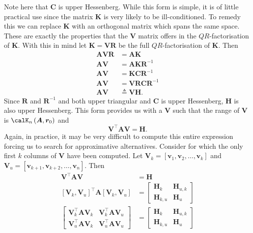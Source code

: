 Note here that $\bm{C}$ is upper Hessenberg. While this form is simple, it is of little practical use since the matrix $\bm{K}$ is very likely to be ill-conditioned. To remedy this we can replace $\bm{K}$ with an orthogonal matrix which spans the same space. These are exactly the properties that the $\bm{V}$ matrix offers in the $QR$-factorisation of $\bm{K}$. With this in mind let $\bm{K} = \bm{V} \bm{R}$ be the full $QR$-factorisation of $\bm{K}$. Then
\begin{align*}
    \bm{A} \bm{V} \bm{R} & = \bm{A} \bm{K}                    \\
    \bm{A} \bm{V}        & = \bm{A} \bm{K} \bm{R}^{-1}        \\
    \bm{A} \bm{V}        & = \bm{K} \bm{C} \bm{R}^{-1}        \\
    \bm{A} \bm{V}        & = \bm{V} \bm{R} \bm{C} \bm{R}^{-1} \\
    \bm{A} \bm{V}        & \triangleq \bm{V} \bm{H}.
\end{align*}
Since $\bm{R}$ and $\bm{R}^{-1}$ and both upper triangular and $\bm{C}$ is upper Hessenberg, $\bm{H}$ is also upper Hessenberg. This form provides us with a $\bm{V}$ such that the range of $\bm{V}$ is $\calK_{n} \left( \bm{A}, \bm{r}_0 \right)$ and
\begin{equation}\label{eq: QTAQ_eq_H}
    \bm{V}^{\intercal} \bm{A} \bm{V} = \bm{H}.
\end{equation}
Again, in practice, it may be very difficult to compute this entire expression forcing us to search for approximative alternatives. Consider  for which the only first $k$ columns of $\bm{V}$ have been computed. Let $\bm{V}_k = \left[ \bm{v}_1 , \bm{v}_2 , \ldots , \bm{v}_k \right]$ and $\bm{V}_u = \left[ \bm{v}_{k+1} , \bm{v}_{k+2} , \ldots , \bm{v}_{n} \right]$. Then
\begin{align*}
    \bm{V}^{\intercal} \bm{A} \bm{V}                                                         & = \bm{H} \\
    \left[ \bm{V}_k , \bm{V}_u \right]^{\intercal} \bm{A} \left[ \bm{V}_k , \bm{V}_u \right] & =
    \begin{bmatrix}
        \bm{H}_k     & \bm{H}_{u,k} \\
        \bm{H}_{k,u} & \bm{H}_{u}
    \end{bmatrix}                                                                           \\
    \begin{bmatrix}
        \bm{V}_{k}^{\intercal} \bm{A} \bm{V}_{k} & \bm{V}_{k}^{\intercal} \bm{A} \bm{V}_{u} \\
        \bm{V}_{u}^{\intercal} \bm{A} \bm{V}_{k} & \bm{V}_{u}^{\intercal} \bm{A} \bm{V}_{u}
    \end{bmatrix}
                                                                                             & =
    \begin{bmatrix}
        \bm{H}_k     & \bm{H}_{u,k} \\
        \bm{H}_{k,u} & \bm{H}_{u}
    \end{bmatrix}
\end{align*}
